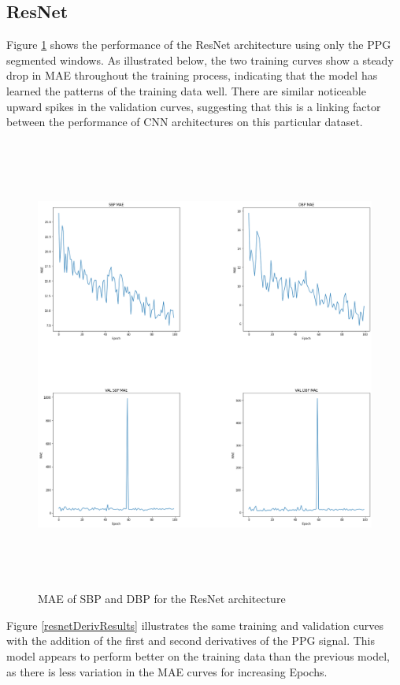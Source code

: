 \subsection{ResNet}
Figure \ref{resnetResults} shows the performance of the ResNet architecture using only the PPG segmented windows. 
As illustrated below, the two training curves show a steady drop in MAE throughout the training process, indicating 
that the model has learned the patterns of the training data well. There are similar noticeable upward spikes in the validation curves, 
suggesting that this is a linking factor between the performance of CNN architectures on this particular dataset.
\begin{figure}[H]
    \centering
    \includegraphics[width=15cm,height=15cm,keepaspectratio]{Results/resnet.png}
    \caption{MAE of SBP and DBP for the ResNet architecture}
    \label{resnetResults}
\end{figure}\noindent Figure \ref{resnetDerivResults} illustrates the same training and validation 
curves with the addition of the first and second derivatives of the PPG signal. This model appears to perform better on the training 
data than the previous model, as there is less variation in the MAE curves for increasing Epochs. 
